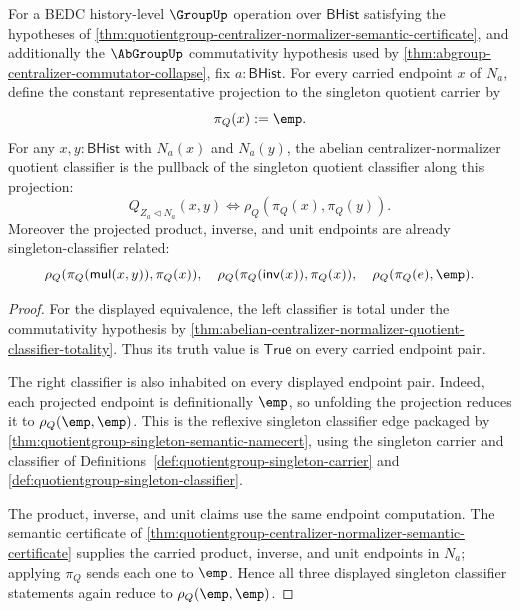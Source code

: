 \begin{theorem}
\label{thm:abelian-centralizer-normalizer-quotient-terminal-projection}
For a BEDC history-level $\GroupUp$ operation over $\mathsf{BHist}$
satisfying the hypotheses of
\autoref{thm:quotientgroup-centralizer-normalizer-semantic-certificate},
and additionally the $\AbGroupUp$ commutativity hypothesis used by
\autoref{thm:abgroup-centralizer-commutator-collapse}, fix
$a:\mathsf{BHist}$. For every carried endpoint $x$ of $N_a$, define the
constant representative projection to the singleton quotient carrier by
$$
\pi_Q(x):=\emp .
$$
For any $x,y:\mathsf{BHist}$ with $N_a(x)$ and $N_a(y)$, the abelian
centralizer-normalizer quotient classifier is the pullback of the singleton
quotient classifier along this projection:
$$
Q_{Z_a\triangleleft N_a}(x,y)\Longleftrightarrow
\rho_Q(\pi_Q(x),\pi_Q(y)).
$$
Moreover the projected product, inverse, and unit endpoints are already
singleton-classifier related:
$$
\rho_Q(\pi_Q(\mathsf{mul}(x,y)),\pi_Q(x)),\quad
\rho_Q(\pi_Q(\mathsf{inv}(x)),\pi_Q(x)),\quad
\rho_Q(\pi_Q(e),\emp).
$$
\end{theorem}
\begin{proof}
For the displayed equivalence, the left classifier is total under the
commutativity hypothesis by
\autoref{thm:abelian-centralizer-normalizer-quotient-classifier-totality}.
Thus its truth value is $\mathsf{True}$ on every carried endpoint pair.

The right classifier is also inhabited on every displayed endpoint pair.
Indeed, each projected endpoint is definitionally $\emp$, so unfolding the
projection reduces it to $\rho_Q(\emp,\emp)$. This is the reflexive singleton
classifier edge packaged by
\autoref{thm:quotientgroup-singleton-semantic-namecert}, using the singleton
carrier and classifier of Definitions~\ref{def:quotientgroup-singleton-carrier}
and \ref{def:quotientgroup-singleton-classifier}.

The product, inverse, and unit claims use the same endpoint computation. The
semantic certificate of
\autoref{thm:quotientgroup-centralizer-normalizer-semantic-certificate}
supplies the carried product, inverse, and unit endpoints in $N_a$; applying
$\pi_Q$ sends each one to $\emp$. Hence all three displayed singleton
classifier statements again reduce to $\rho_Q(\emp,\emp)$.
\end{proof}

